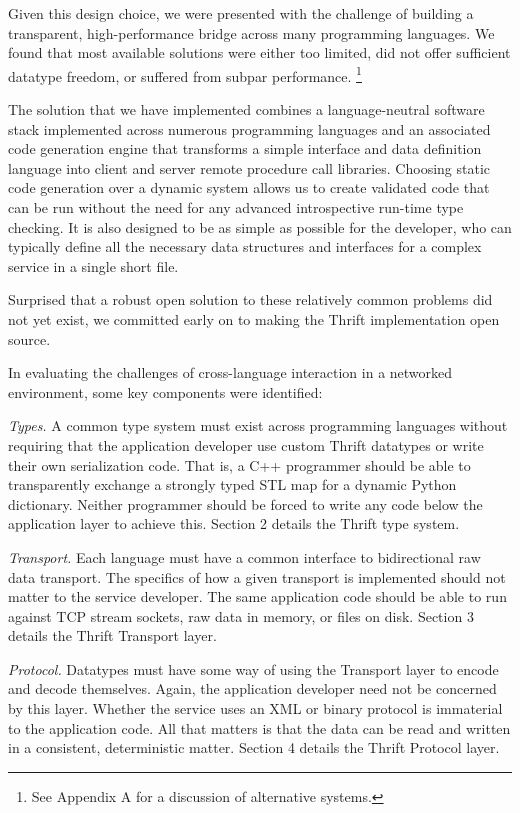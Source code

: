 \documentclass[nocopyrightspace,blockstyle]{sigplanconf}
\begin{document}
Given this design choice, we were presented with the challenge of building
a transparent, high-performance bridge across many programming languages.
We found that most available solutions were either too limited, did not offer
sufficient datatype freedom, or suffered from subpar performance.
\footnote{See Appendix A for a discussion of alternative systems.}

The solution that we have implemented combines a language-neutral software
stack implemented across numerous programming languages and an associated code
generation engine that transforms a simple interface and data definition
language into client and server remote procedure call libraries.
Choosing static code generation over a dynamic system allows us to create
validated code that can be run without the need for
any advanced introspective run-time type checking. It is also designed to
be as simple as possible for the developer, who can typically define all
the necessary data structures and interfaces for a complex service in a single
short file.

Surprised that a robust open solution to these relatively common problems
did not yet exist, we committed early on to making the Thrift implementation
open source.

In evaluating the challenges of cross-language interaction in a networked
environment, some key components were identified:

\textit{Types.} A common type system must exist across programming languages
without requiring that the application developer use custom Thrift datatypes
or write their own serialization code. That is,
a C++ programmer should be able to transparently exchange a strongly typed
STL map for a dynamic Python dictionary. Neither
programmer should be forced to write any code below the application layer
to achieve this. Section 2 details the Thrift type system.

\textit{Transport.} Each language must have a common interface to
bidirectional raw data transport. The specifics of how a given
transport is implemented should not matter to the service developer.
The same application code should be able to run against TCP stream sockets,
raw data in memory, or files on disk. Section 3 details the Thrift Transport
layer.

\textit{Protocol.} Datatypes must have some way of using the Transport
layer to encode and decode themselves. Again, the application
developer need not be concerned by this layer. Whether the service uses
an XML or binary protocol is immaterial to the application code.
All that matters is that the data can be read and written in a consistent,
deterministic matter. Section 4 details the Thrift Protocol layer.
\end{document}
